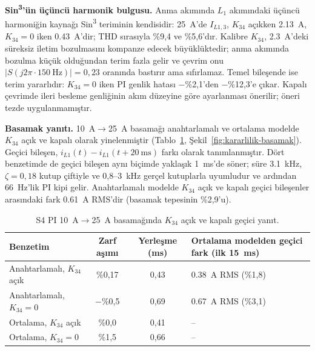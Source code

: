 \textbf{Sin\textsuperscript{3}'ün üçüncü harmonik bulgusu.} Anma akımında $L_1$ akımındaki üçüncü harmoniğin kaynağı Sin\textsuperscript{3} teriminin kendisidir: \SI{25}{\ampere}'de $I_{L1,3}$, $K_{34}$ açıkken \SI{2.13}{\ampere}, $K_{34}=0$ iken \SI{0.43}{\ampere}'dir; THD sırasıyla \%9,4 ve \%5,6'dır. Kalibre $K_{34}$, \SI{2.3}{\ampere}'deki süreksiz iletim bozulmasını kompanze edecek büyüklüktedir; anma akımında bozulma küçük olduğundan terim fazla gelir ve çevrim onu $|S(j2\pi\cdot\SI{150}{\hertz})|=0{,}23$ oranında bastırır ama sıfırlamaz. Temel bileşende ise terim yararlıdır: $K_{34}=0$ iken PI genlik hatası $-$\%2,1'den $-$\%12,3'e çıkar. Kapalı çevrimde ileri besleme genliğinin akım düzeyine göre ayarlanması önerilir; öneri tezde uygulanmamıştır.

\textbf{Basamak yanıtı.} \SI{10}{\ampere}$\rightarrow$\SI{25}{\ampere} basamağı anahtarlamalı ve ortalama modelde $K_{34}$ açık ve kapalı olarak yinelenmiştir (Tablo~\ref{tab:kararlilik-basamak}, Şekil~\ref{fig:kararlilik-basamak}). Geçici bileşen, $i_{L1}(t)-i_{L1}(t+\SI{20}{\milli\second})$ farkı olarak tanımlanmıştır. Dört benzetimde de geçici bileşen aynı biçimde yaklaşık \SI{1}{\milli\second}'de söner; süre \SI{3.1}{\kilo\hertz}, $\zeta=0{,}18$ kutup çiftiyle ve 0,8--\SI{3}{\kilo\hertz} gerçel kutuplarla uyumludur ve ardından \SI{66}{\hertz}'lik PI kipi gelir. Anahtarlamalı modelde $K_{34}$ açık ve kapalı geçici bileşenler arasındaki fark \SI{0.61}{\ampere} RMS'dir (basamak tepesinin \%2,9'u).

\begin{table}[htbp]
  \centering
  \caption{S4 PI \SI{10}{\ampere}$\rightarrow$\SI{25}{\ampere} basamağında $K_{34}$ açık ve kapalı geçici yanıt.}
  \label{tab:kararlilik-basamak}
  \small
  \begin{tabularx}{\textwidth}{@{}X c c >{\raggedright\arraybackslash}p{}@{}}
    \toprule
    Benzetim & Zarf aşımı & Yerleşme (ms) & Ortalama modelden geçici fark (ilk \SI{15}{\milli\second}) \\
    \midrule
    Anahtarlamalı, $K_{34}$ açık & \%0,17 & 0,43 & \SI{0.38}{\ampere} RMS (\%1,8) \\
    Anahtarlamalı, $K_{34}=0$    & $-$\%0,5 & 0,69 & \SI{0.67}{\ampere} RMS (\%3,1) \\
    Ortalama, $K_{34}$ açık      & \%0,0 & 0,41 & -- \\
    Ortalama, $K_{34}=0$         & \%1,5 & 0,66 & -- \\
    \bottomrule
  \end{tabularx}
\end{table}

